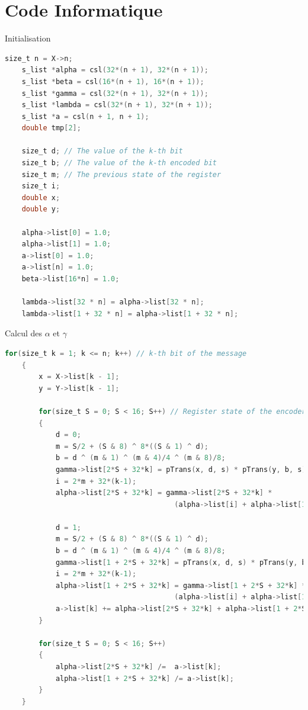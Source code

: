 \documentclass[11pt]{beamer}
\begin{document}
\section{Code Informatique}


\begin{frame}{Initialisation}
	\begin{lstlisting}[language=C]
    size_t n = X->n;
    s_list *alpha = csl(32*(n + 1), 32*(n + 1));
    s_list *beta = csl(16*(n + 1), 16*(n + 1));
    s_list *gamma = csl(32*(n + 1), 32*(n + 1));
    s_list *lambda = csl(32*(n + 1), 32*(n + 1));
    s_list *a = csl(n + 1, n + 1);
    double tmp[2];

    size_t d; // The value of the k-th bit
    size_t b; // The value of the k-th encoded bit
    size_t m; // The previous state of the register
    size_t i;
    double x;
    double y;

    alpha->list[0] = 1.0;
    alpha->list[1] = 1.0;
    a->list[0] = 1.0;
    a->list[n] = 1.0;
    beta->list[16*n] = 1.0;

    lambda->list[32 * n] = alpha->list[32 * n];
    lambda->list[1 + 32 * n] = alpha->list[1 + 32 * n];
	\end{lstlisting}
\end{frame}

\begin{frame}{Calcul des $\alpha$ et $\gamma$}
	\begin{lstlisting}[language=C]
	for(size_t k = 1; k <= n; k++) // k-th bit of the message
    {
        x = X->list[k - 1];
        y = Y->list[k - 1];

        for(size_t S = 0; S < 16; S++) // Register state of the encoder
        {
            d = 0;
            m = S/2 + (S & 8) ^ 8*((S & 1) ^ d);
            b = d ^ (m & 1) ^ (m & 4)/4 ^ (m & 8)/8;
            gamma->list[2*S + 32*k] = pTrans(x, d, s) * pTrans(y, b, s);
            i = 2*m + 32*(k-1);
            alpha->list[2*S + 32*k] = gamma->list[2*S + 32*k] *
                                        (alpha->list[i] + alpha->list[1 + i]);

            d = 1;
            m = S/2 + (S & 8) ^ 8*((S & 1) ^ d);
            b = d ^ (m & 1) ^ (m & 4)/4 ^ (m & 8)/8;
            gamma->list[1 + 2*S + 32*k] = pTrans(x, d, s) * pTrans(y, b, s);
            i = 2*m + 32*(k-1);
            alpha->list[1 + 2*S + 32*k] = gamma->list[1 + 2*S + 32*k] *
                                        (alpha->list[i] + alpha->list[1 + i]);
            a->list[k] += alpha->list[2*S + 32*k] + alpha->list[1 + 2*S + 32*k];
        }

        for(size_t S = 0; S < 16; S++)
        {
            alpha->list[2*S + 32*k] /=  a->list[k];
            alpha->list[1 + 2*S + 32*k] /= a->list[k];
        }
    }
	\end{lstlisting}
\end{frame}
\end{document}
